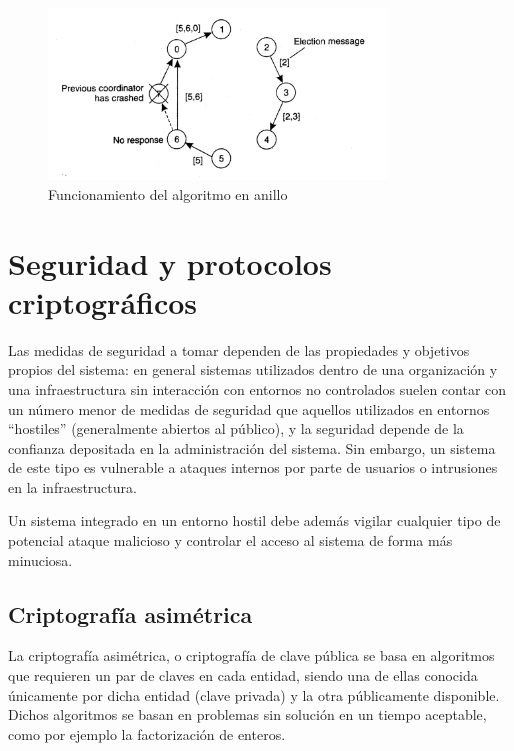 \begin{figure}[H]
  \centering
  \includegraphics[width=0.8\textwidth]{Chapter2/Figures/ringalgorithm}
  \caption{Funcionamiento del algoritmo en anillo}
  \label{fig:tanenbaum:ringalgoritm}
\end{figure} 


\section{Seguridad y protocolos criptográficos}

Las medidas de seguridad a tomar dependen de las propiedades y objetivos propios del sistema: en general sistemas utilizados dentro de una organización y una infraestructura sin interacción con entornos no controlados suelen contar con un número menor de medidas de seguridad que aquellos utilizados en entornos ``hostiles'' (generalmente abiertos al público), y la seguridad depende de la confianza depositada en la administración del sistema. Sin embargo, un sistema de este tipo es vulnerable a ataques internos por parte de usuarios o intrusiones en la infraestructura.

Un sistema integrado en un entorno hostil debe además vigilar cualquier tipo de potencial ataque malicioso y controlar el acceso al sistema de forma más minuciosa.



\subsection{Criptografía asimétrica}

La criptografía asimétrica, o criptografía de clave pública se basa en algoritmos que requieren un par de claves en cada entidad, siendo una de ellas conocida únicamente por dicha entidad (clave privada) y la otra públicamente disponible. Dichos algoritmos se basan en problemas sin solución en un tiempo aceptable, como por ejemplo la factorización de enteros.

